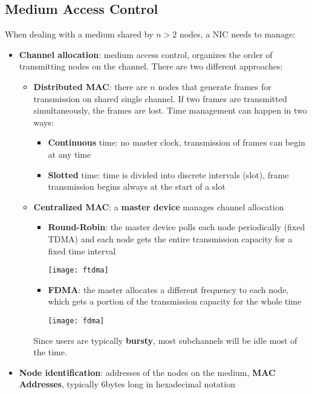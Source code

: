 \newpage
\subsection{Medium Access Control}
When dealing with a medium shared by $n>2$ nodes, a NIC needs to manage:
\begin{itemize}
	\item \textbf{Channel allocation}: medium access control, organizes the order of transmitting nodes on the channel. There are two different approaches:
	\begin{itemize}
		\item \textbf{Distributed MAC}: there are $n$ nodes that generate frames for transmission on shared single channel. If two frames are transmitted simultaneously, the frames are lost. Time management can happen in two ways:
		\begin{itemize}
			\item \textbf{Continuous} time: no master clock, transmission of frames can begin at any time
			\item \textbf{Slotted} time: time is divided into discrete intervals (slot), frame transmission begins always at the start of a slot
		\end{itemize}
		\item \textbf{Centralized MAC}: a \textbf{master device} manages channel allocation
		\begin{itemize}
			\item \textbf{Round-Robin}: the master device polls each node periodically (fixed TDMA) and each node gets the entire transmission capacity for a fixed time interval
			\begin{center}
				\texttt{[image: ftdma]}
			\end{center}
			\item \textbf{FDMA}: the master allocates a different frequency to each node, which gets a portion of the transmission capacity for the whole time
			\begin{center}
				\texttt{[image: fdma]}
			\end{center}
		\end{itemize}
		Since users are typically \textbf{bursty}, most subchannels will be idle most of the time.
	\end{itemize}
	\item \textbf{Node identification}: addresses of the nodes on the medium, \textbf{MAC Addresses}, typically $6$bytes long in hexadecimal notation
\end{itemize}


